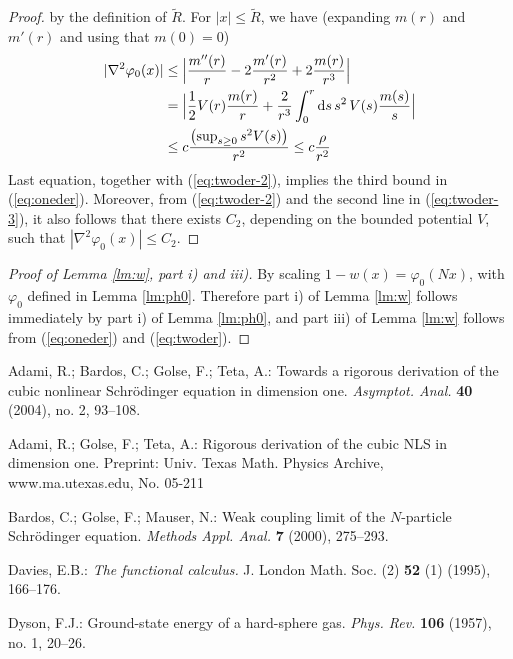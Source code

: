 \documentclass[11pt]{article}
\newcommand{\rd}{{\rm d}}
\newcommand{\ph}{\varphi}
\newcommand{\wt}{\widetilde}
\begin{document}
\begin{proof}
by the definition of $\wt R$. For $|x| \leq \wt R$, we have
(expanding $m(r)$ and $m'(r)$ and using that $m(0)=0$)
\begin{equation}\label{eq:twoder-3}
\begin{split}
|\nabla^2 \ph_0 (x)| &\leq \Big| \frac{m'' (r)}{r} -
2\frac{m'(r)}{r^2} +2 \frac{m(r)}{r^3} \Big| \\
&= \Big| \frac{1}{2} V(r) \frac{m(r)}{r} + \frac{2}{r^3} \int_0^r
\rd s \, s^2 \, V(s) \frac{m(s)}{s} \Big| \\ &\leq c
\frac{\left(\sup_{s \geq 0} s^2 V(s) \right)}{r^2} \leq c
\frac{\rho}{r^2}
\end{split}
\end{equation}
Last equation, together with (\ref{eq:twoder-2}), implies the third
bound in (\ref{eq:oneder}). Moreover, from (\ref{eq:twoder-2}) and
the second line in (\ref{eq:twoder-3}), it also follows that there
exists $C_2$, depending on the bounded potential $V$, such that
$|\nabla^2 \ph_0 (x)| \leq C_2$.
\end{proof}

\begin{proof}[Proof of Lemma \ref{lm:w}, part i) and iii)]
By scaling $1-w(x) = \ph_0 (Nx)$, with $\ph_0$ defined in Lemma
\ref{lm:ph0}. Therefore part i) of Lemma \ref{lm:w} follows
immediately by part i) of Lemma \ref{lm:ph0}, and part iii) of Lemma
\ref{lm:w} follows from (\ref{eq:oneder}) and (\ref{eq:twoder}).
\end{proof}





 Adami, R.; Bardos, C.; Golse, F.; Teta, A.:
Towards a rigorous derivation of the cubic nonlinear Schr\"odinger
equation in dimension one. \textit{Asymptot. Anal.} \textbf{40}
(2004), no. 2, 93--108.

 Adami, R.; Golse, F.; Teta, A.:
Rigorous derivation of the cubic NLS in dimension one. Preprint:
Univ. Texas Math. Physics Archive, www.ma.utexas.edu, No. 05-211



Bardos, C.; Golse, F.; Mauser, N.: Weak coupling limit of the
$N$-particle Schr\"odinger equation.
\textit{Methods Appl. Anal.} \textbf{7} (2000), 275--293.

Davies, E.B.: {\sl The functional calculus.} J. London Math. Soc. (2)
{\bf 52} (1) (1995), 166--176.


 Dyson, F.J.:  Ground-state energy of a hard-sphere
gas. \textit{Phys. Rev.} \textbf{106} (1957), no. 1, 20--26.
\end{document}
